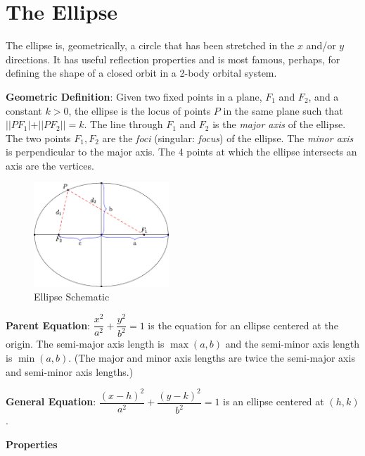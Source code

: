 \documentclass[11pt]{article}
\author{}
\date{}
\let\oldsection\section
\renewcommand{\section}[1]{\clearpage\oldsection{#1}}
\begin{document}
\hypertarget{the-ellipse}{%
\section{The Ellipse}\label{the-ellipse}}

The ellipse is, geometrically, a circle that has been stretched in the
\(x\) and/or \(y\) directions. It has useful reflection properties and
is most famous, perhaps, for defining the shape of a closed orbit in a
2-body orbital system.

\textbf{Geometric Definition}: Given two fixed points in a plane,
\(F_1\) and \(F_2\), and a constant \(k > 0\), the ellipse is the locus
of points \(P\) in the same plane such that \(||PF_1| + ||PF_2|| = k\).
The line through \(F_1\) and \(F_2\) is the \emph{major axis} of the
ellipse. The two points \(F_1,F_2\) are the \emph{foci} (singular:
\emph{focus}) of the ellipse. The \emph{minor axis} is perpendicular to
the major axis. The 4 points at which the ellipse intersects an axis are
the vertices.

\begin{figure}
\centering
\includegraphics[width=2in,height=\textheight]{workspace.jpeg}
\caption{Ellipse Schematic}
\end{figure}

\textbf{Parent Equation}: \(\dfrac{x^2}{a^2}+\dfrac{y^2}{b^2}=1\) is the
equation for an ellipse centered at the origin. The semi-major axis
length is \(\max(a,b)\) and the semi-minor axis length is \(\min(a,b)\).
(The major and minor axis lengths are twice the semi-major axis and
semi-minor axis lengths.)

\textbf{General Equation}:
\(\dfrac{(x-h)^2}{a^2} + \dfrac{(y-k)^2}{b^2} = 1\) is an ellipse
centered at \((h,k)\).

\textbf{Properties}
\end{document}
